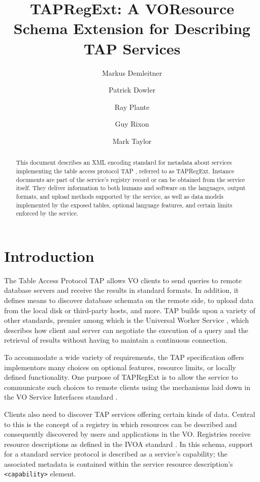 \documentclass{ivoa}
\author[http://www.ivoa.net/cgi-bin/twiki/bin/view/IVOA/MarkusDemleitner]{Markus
Demleitner}
\author[http://www.ivoa.net/cgi-bin/twiki/bin/view/IVOA/PatrickDowler]{Patrick
Dowler}
\author[http://www.ivoa.net/cgi-bin/twiki/bin/view/IVOA/RayPlante]{Ray
Plante}
\author[http://www.ivoa.net/cgi-bin/twiki/bin/view/IVOA/GuyRixon]{Guy
Rixon}
\author[http://www.ivoa.net/cgi-bin/twiki/bin/view/IVOA/MarkTaylor]{Mark
Taylor}
\title{TAPRegExt: A VOResource Schema Extension for Describing TAP Services}
\begin{document}
\begin{abstract}
This document describes an XML encoding standard for metadata about
services implementing the table access protocol TAP \citep{2019ivoa.spec.0927D},
referred to as TAPRegExt.  Instance documents are
part of the service's registry record or can be obtained from the service
itself.  They deliver information to both humans and software on the languages,
output formats, and upload methods supported by the service, as well as data
models implemented by the exposed tables, optional language features,
and certain limits enforced by the service.
\end{abstract}


\section{Introduction}

\label{introduction}

The Table Access Protocol TAP \citep{2019ivoa.spec.0927D} allows
VO clients to send queries to remote database servers and receive the
results in standard formats.  In addition, it defines means to discover
database schemata on the remote side, to upload data from the local disk
or third-party hosts, and more.  TAP builds upon a variety of other
standards, premier among which is the Universal Worker Service
\citep{2016ivoa.spec.1024H}, which describes how client and server
can negotiate the execution of a query and the retrieval of results
without having to maintain a continuous connection.

To accommodate a wide variety of requirements, the TAP specification
offers implementors many choices on optional features, resource limits, or
locally defined functionality.  One purpose of TAPRegExt is to allow the
service to communicate such choices to remote clients using the mechanisms
laid down in the VO Service Interfaces standard
\citep{2017ivoa.spec.0524G}.

Clients also need to discover TAP services offering certain kinds of data.
Central to this is the concept of a registry in which resources can be
described and consequently discovered by users and applications in the VO.
Registries receive resource descriptions as defined in the IVOA standard
\citep{2018ivoa.spec.0625P}. In this schema, support for
a standard service protocol is described as a service's capability; the
associated metadata is contained within the service resource description's
\texttt{<capability>} element.
\end{document}
